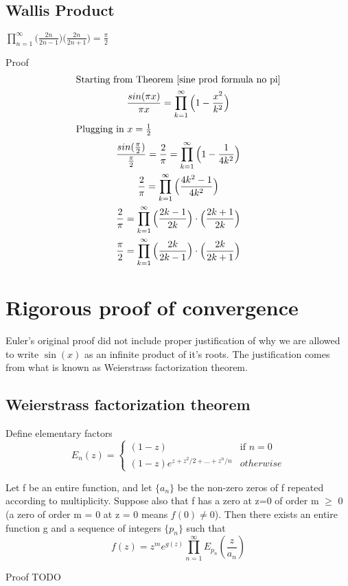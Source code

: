\documentclass[a4paper]{article}
\begin{document}
\subsection{Wallis Product}
\label{wallis product}
\begin{theorem} 
$\boxed{ 
\prod_{n=1}^{\infty} \Big( \frac{2n}{2n-1} \Big) \Big( \frac{2n}{2n+1} \Big) = \frac{\pi}{2}
}$

Proof\\
\begin{gather*}
\text{Starting from Theorem \ref{sine prod formula no pi}}
\\
\frac{sin(\pi x)}{\pi x} = \prod_{k=1}^{\infty} \Big( 1-\frac{x^2}{k^2} \Big)
\\
\intertext{Plugging in $x=\frac{1}{2}$}
\frac{sin(\frac{\pi}{2})}{\frac{\pi}{2}} = 
\frac{2}{\pi} = \prod_{k=1}^{\infty} \Big( 1-\frac{1}{4 k^2} \Big)
\\
\frac{2}{\pi} = \prod_{k=1}^{\infty} \Big( \frac{4 k^2 -1}{4 k^2} \Big)
\\
\frac{2}{\pi} = \prod_{k=1}^{\infty} \Big( \frac{2 k -1}{2 k} \Big) \cdot \Big( \frac{2 k +1}{2 k} \Big)
\\
\frac{\pi}{2} = \prod_{k=1}^{\infty} \Big( \frac{2k}{2 k -1} \Big) \cdot \Big( \frac{2 k }{2 k+1} \Big)
\end{gather*}
\end{theorem}



\section{Rigorous proof of convergence}
\label{rigour}
Euler's original proof did not include proper justification of why we are allowed to write $\sin(x)$ as an infinite product of it's roots. The justification comes from what is known as Weierstrass factorization theorem. 

\subsection{Weierstrass factorization theorem}
Define elementary factors
\begin{equation}
E_{n}(z) = 
\begin{cases}
(1-z) &\text{if } n=0 \\
(1-z) e^{z + z^2/2 + ... + z^n /n} & otherwise 
\end{cases}
\end{equation}

\begin{theorem}
Let f be an entire function, and let $\{a_n\}$ be the non-zero zeros of f repeated according to multiplicity. Suppose also that f has a zero at z=0 of order m $\geq$ 0 (a zero of order m = 0 at z = 0 means $f(0) \not = 0$). Then there exists an entire function g and a sequence of integers  $\{p_n\}$ such that
\begin{equation}
f(z) = z^m e^{g(z)} \prod_{n=1}^{\infty} E_{p_n}(\frac{z}{a_n})
\end{equation}



Proof
TODO
\end{theorem}
\end{document}

